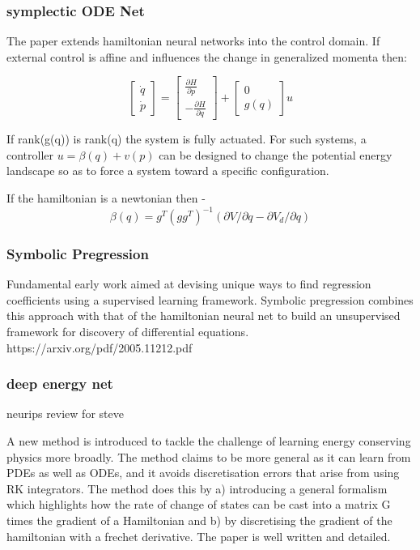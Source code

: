 \documentclass{article}
\begin{document}
\subsubsection*{symplectic ODE Net}

The paper extends hamiltonian neural networks into the control domain. If external control is affine and influences the change in generalized momenta then:

$$ 
\begin{bmatrix}
\dot{q} \\
\dot{p}
\end{bmatrix}
= 
\begin{bmatrix}
\frac{\partial H}{\partial p} \\
-\frac{\partial H}{\partial q}
\end{bmatrix}
+
\begin{bmatrix}
0 \\
g(q)
\end{bmatrix} u
$$

If rank(g(q)) is rank(q) the system is fully actuated. For such systems, a controller $u = \beta(q) +v(p) $ can be designed to change the potential energy landscape so as to force a system toward a specific configuration.

If the hamiltonian is a newtonian then - $$ \beta(q) = g^T (gg^T)^{-1} (\partial V/\partial q - \partial V_d/\partial q) $$

\subsubsection*{Symbolic Pregression}

Fundamental early work aimed at devising unique ways to find regression coefficients using a supervised learning framework. Symbolic pregression combines this approach with that of the hamiltonian neural net to build an unsupervised framework for discovery of differential equations.
https://arxiv.org/pdf/2005.11212.pdf




\subsubsection*{deep energy net}
neurips review for steve

A new method is introduced to tackle the challenge of learning energy conserving physics more broadly. The method claims to be more general as it can learn from PDEs as well as ODEs, and it avoids discretisation errors that arise from using RK integrators. The method does this by a) introducing a general formalism which highlights how the rate of change of states can be cast into a matrix G times the gradient of a Hamiltonian and b) by discretising the gradient of the hamiltonian with a frechet derivative. The paper is well written and detailed.
\end{document}
